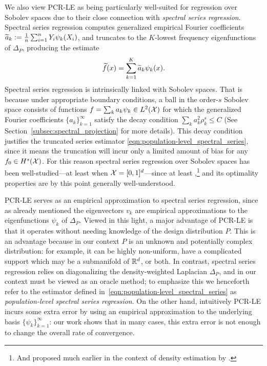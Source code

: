 We also view PCR-LE as being particularly well-suited for regression over Sobolev spaces due to their close connection with \emph{spectral series regression}. Spectral series regression computes generalized empirical Fourier coefficients $\widetilde{a}_k := \frac{1}{n}\sum_{i = 1}^{n} Y_i \psi_k(X_i)$, and truncates to the $K$-lowest frequency eigenfunctions of $\Delta_P$, producing the estimate
\begin{equation}
\label{eqn:population-level_spectral_series}
\widetilde{f}(x) = \sum_{k = 1}^{K} \widetilde{a}_k \psi_k(x).
\end{equation} 
Spectral series regression is intrinsically linked with Sobolev spaces. That is because under appropriate boundary conditions, a ball in the order-$s$ Sobolev space consists of functions $f = \sum_{k} a_k \psi_k \in L^2(\mathcal{X})$ for which the generalized Fourier coefficients $\{a_k\}_{k = 1}^{\infty}$ satisfy the decay condition $\sum_{k} a_k^2 \rho_k^s \leq C$ (See Section~\ref{subsec:spectral_projection} for more details). This decay condition justifies the truncated series estimator \eqref{eqn:population-level_spectral_series}, since it means the truncation will incur only a limited amount of bias for any $f_0 \in H^s(\mathcal{X})$. For this reason spectral series regression over Sobolev spaces has been well-studied---at least when $\mathcal{X} = [0,1]^d$---since at least \citet{rice1984},\footnote{And proposed much earlier in the context of density estimation by \citet{cencov1962}.} and its optimality properties are by this point generally well-understood.

PCR-LE serves as an empirical approximation to spectral series regression, since as already mentioned the eigenvectors $v_k$ are empirical approximations to the eigenfunctions $\psi_k$ of $\Delta_P$. Viewed in this light, a major advantage of PCR-LE is that it operates without needing knowledge of the design distribution $P$. This is an advantage because in our context $P$ is an unknown and potentially complex distribution: for example, it can be highly non-uniform, have a complicated support which may be a submanifold of $\mathbb{R}^d$, or both. In contrast, spectral series regression relies on diagonalizing the density-weighted Laplacian $\Delta_P$, and in our context must be viewed as an oracle method; to emphasize this we henceforth refer to the estimator defined in~\eqref{eqn:population-level_spectral_series} as \emph{population-level spectral series regression}. On the other hand, intuitively PCR-LE incurs some extra error by using an empirical approximation to the underlying basis $\{\psi_k\}_{k = 1}^{\infty}$: our work shows that in many cases, this extra error is not enough to change the overall rate of convergence.

